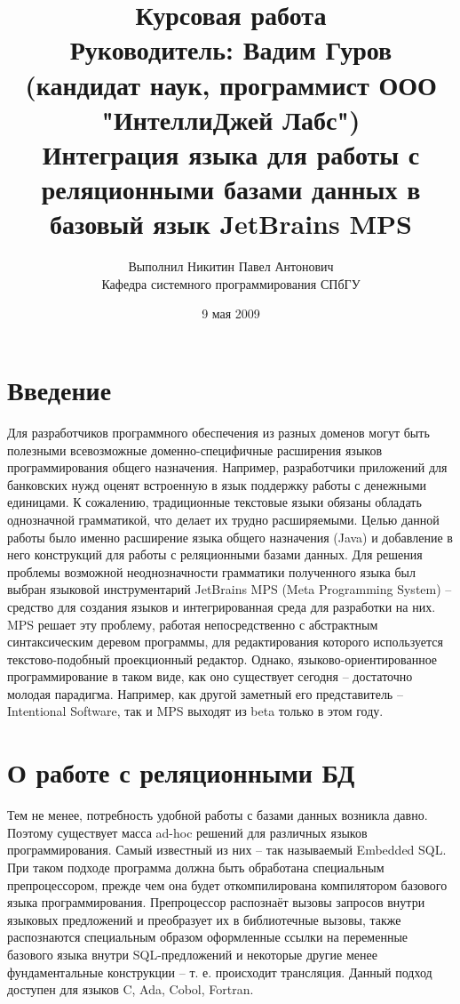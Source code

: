 \documentclass[12pt]{article}
\title{Курсовая работа\\
Руководитель: Вадим Гуров\\
(кандидат наук, программист ООО "ИнтеллиДжей Лабс")\\
Интеграция языка для работы с реляционными базами данных в базовый язык JetBrains MPS}
\author{Выполнил Никитин Павел Антонович\\
Кафедра системного программирования СПбГУ}
\date{9 мая 2009}
\begin{document}
\maketitle	

\section{Введение}
Для разработчиков программного обеспечения из разных доменов могут быть полезными всевозможные доменно-специфичные расширения языков программирования общего назначения. Например, разработчики приложений для банковских нужд оценят встроенную в язык поддержку работы с денежными единицами. К сожалению, традиционные текстовые языки обязаны обладать однозначной грамматикой, что делает их трудно расширяемыми. Целью данной работы было именно расширение языка общего назначения (Java) и добавление в него конструкций для работы с реляционными базами данных. Для решения проблемы возможной неоднозначности грамматики полученного языка был выбран языковой инструментарий JetBrains MPS (Meta Programming System) -- средство для создания языков и интегрированная среда для разработки на них. MPS решает эту проблему, работая непосредственно с абстрактным синтаксическим деревом программы, для редактирования которого используется текстово-подобный проекционный редактор. Однако, языково-ориентированное программирование в таком виде, как оно существует сегодня -- достаточно молодая парадигма. Например, как другой заметный его представитель -- Intentional Software, так и MPS выходят из beta только в этом году.\\

\section{О работе с реляционными БД}
Тем не менее, потребность удобной работы с базами данных возникла давно. Поэтому существует масса ad-hoc решений для различных языков программирования. Самый известный из них -- так называемый Embedded SQL. При таком подходе программа должна быть обработана специальным препроцессором, прежде чем она будет откомпилирована компилятором базового языка программирования. Препроцессор распознаёт вызовы запросов внутри языковых предложений и преобразует их в библиотечные вызовы, также распознаются специальным образом оформленные ссылки на переменные базового языка внутри SQL-предложений и некоторые другие менее фундаментальные конструкции -- т. е. происходит трансляция. Данный подход доступен для языков C, Ada, Cobol, Fortran.\\
\end{document}

